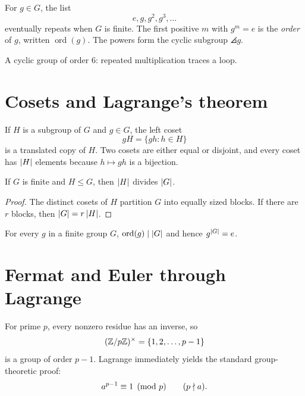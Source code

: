 For $g\in G$, the list
\[
e,g,g^2,g^3,\dots
\]
eventually repeats when $G$ is finite. The first positive $m$ with $g^m=e$ is the \emph{order} of $g$, written $\operatorname{ord}(g)$. The powers form the cyclic subgroup $\angles g$.

\begin{center}

\small A cyclic group of order $6$: repeated multiplication traces a loop.
\end{center}

\section{Cosets and Lagrange's theorem}

If $H$ is a subgroup of $G$ and $g\in G$, the left coset
\[
gH=\{gh:h\in H\}
\]
is a translated copy of $H$. Two cosets are either equal or disjoint, and every coset has $\left|H\right|$ elements because $h\mapsto gh$ is a bijection.

\begin{theorem}[Lagrange]
If $G$ is finite and $H\le G$, then $\left|H\right|$ divides $\left|G\right|$.
\end{theorem}

\begin{proof}
The distinct cosets of $H$ partition $G$ into equally sized blocks. If there are $r$ blocks, then $\left|G\right|=r\left|H\right|$.
\end{proof}

\begin{corollary}
For every $g$ in a finite group $G$, $\operatorname{ord}(g)\mid\left|G\right|$ and hence $g^{\left|G\right|}=e$.
\end{corollary}

\section{Fermat and Euler through Lagrange}

For prime $p$, every nonzero residue has an inverse, so
\[
(\mathbb Z/p\mathbb Z)^\times=\{1,2,\dots,p-1\}
\]
is a group of order $p-1$. Lagrange immediately yields the standard group-theoretic proof:
\[
a^{p-1}\equiv1\pmod p\qquad(p\nmid a).
\]

